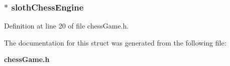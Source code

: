 \subsubsection[{sloth\+Chess\+Engine}]{$\ast$ sloth\+Chess\+Engine}\label{struct_chess_game_a9ed60838681952864cc250e5b572a8ea}


Definition at line 20 of file chess\+Game.\+h.



The documentation for this struct was generated from the following file\+:\begin{DoxyCompactItemize}
\item 
{\bf chess\+Game.\+h}\end{DoxyCompactItemize}

